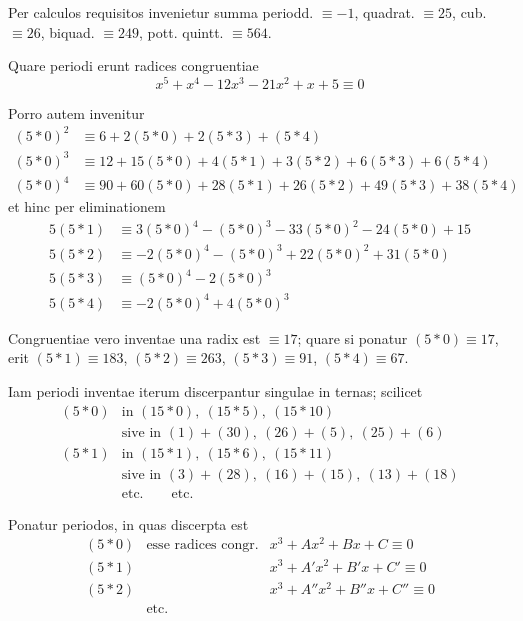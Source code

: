 Per calculos requisitos invenietur summa periodd. $\equiv-1$, quadrat. $\equiv25$, cub. $\equiv26$, biquad. $\equiv249$, pott. quintt. $\equiv564$.

Quare periodi erunt radices congruentiae
\[
x^5+x^4-12x^3-21x^2+x+5\equiv0
\]

Porro autem invenitur
\[
\begin{aligned}
(5\ast0)^2&\equiv6+2(5\ast0)+2(5\ast3)+(5\ast4)\\
(5\ast0)^3&\equiv12+15(5\ast0)+4(5\ast1)+3(5\ast2)+6(5\ast3)+6(5\ast4)\\
(5\ast0)^4&\equiv90+60(5\ast0)+28(5\ast1)+26(5\ast2)+49(5\ast3)+38(5\ast4)
\end{aligned}
\]
et hinc per eliminationem
\[
\begin{aligned}
5(5\ast1)&\equiv3(5\ast0)^4-(5\ast0)^3-33(5\ast0)^2-24(5\ast0)+15\\
5(5\ast2)&\equiv-2(5\ast0)^4-(5\ast0)^3+22(5\ast0)^2+31(5\ast0)\\
5(5\ast3)&\equiv(5\ast0)^4-2(5\ast0)^3\\
5(5\ast4)&\equiv-2(5\ast0)^4+4(5\ast0)^3
\end{aligned}
\]

Congruentiae vero inventae una radix est $\equiv17$; quare si ponatur $(5\ast0)\equiv17$, erit $(5\ast1)\equiv183$, $(5\ast2)\equiv263$, $(5\ast3)\equiv91$, $(5\ast4)\equiv67$.

Iam periodi inventae iterum discerpantur singulae in ternas; scilicet
\[
\begin{array}{rl}
(5\ast0)&\text{in }(15\ast0),\ (15\ast5),\ (15\ast10)\\
&\text{sive in }(1)+(30),\ (26)+(5),\ (25)+(6)\\
(5\ast1)&\text{in }(15\ast1),\ (15\ast6),\ (15\ast11)\\
&\text{sive in }(3)+(28),\ (16)+(15),\ (13)+(18)\\
&\text{etc.}\qquad\text{etc.}
\end{array}
\]

Ponatur periodos, in quas discerpta est
\[
\begin{array}{rll}
(5\ast0)&\text{esse radices congr.}&x^3+Ax^2+Bx+C\equiv0\\
(5\ast1)&&x^3+A'x^2+B'x+C'\equiv0\\
(5\ast2)&&x^3+A''x^2+B''x+C''\equiv0\\
&\text{etc.}
\end{array}
\]

